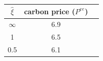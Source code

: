 \begin{tabular}{ccc}
\hline
\rule{0pt}{1.2em}
 $\widehat \xi$ &  carbon price ($P^{ee}$)\\
\hline

  $\infty$ & 6.9 \\
  1 & 6.5 \\
  0.5 & 6.1 \\

\hline
\end{tabular}

